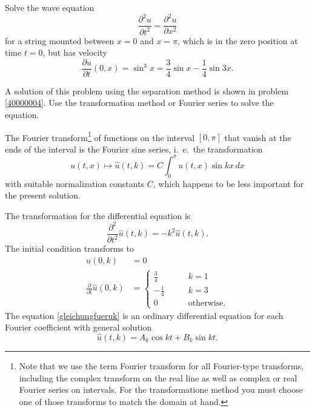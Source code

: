 Solve the wave equation
\[
\frac{\partial^2 u}{\partial t^2}=\frac{\partial^2 u}{\partial x^2}
\]
for a string mounted between $x=0$ and $x=\pi$,
which is in the zero position at time $t=0$, but has velocity
\[
\frac{\partial u}{\partial t}(0, x)
=
\sin^3 x=\frac34\sin x-\frac14\sin 3x.
\]

\begin{hinweis}
A solution of this problem using the separation method is shown in 
problem \ref{40000004}.
Use the transformation method or Fourier series to solve the equation.
\end{hinweis}

\begin{loesung}
The Fourier transform\footnote{Note that we use the term Fourier transform
for all Fourier-type transforms, including the complex transform on the
real line as well as complex or real Fourier series on intervals.
For the transformatione method you must choose one of those transforms
to match the domain at hand.}
of functions on the interval $[0,\pi]$ that vanish
at the ends of the interval is the Fourier sine series, i.~e.~the
transformation
\[
u(t,x) \mapsto \hat u(t, k)= C\int_0^{\pi} u(t,x)\sin kx\, dx
\]
with suitable normalization constants $C$, which happens to be less important
for the present solution.

The transformation for the differential equation is
\begin{equation}
\frac{\partial^2}{\partial t^2}\hat u(t,k)
=-k^2\hat u(t,k).
\label{gleichungfueruk}
\end{equation}
The initial condition transforms to
\begin{align}
\hat u(0,k)&=0\label{40000004:anfbedu}\\
\frac{\partial}{\partial t}\hat u(0,k)&=
\begin{cases}
\frac34&\qquad k= 1\\
-\frac14&\qquad k= 3\\
0&\qquad \text{otherwise.}
\end{cases}
\label{40000004:anfbedudot}
\end{align}
The equation
\eqref{gleichungfueruk}
is an ordinary differential equation for each Fourier coefficient
with general solution
\[
\hat u(t,k)=A_k\cos kt+B_k\sin kt.
\]


\end{loesung}
